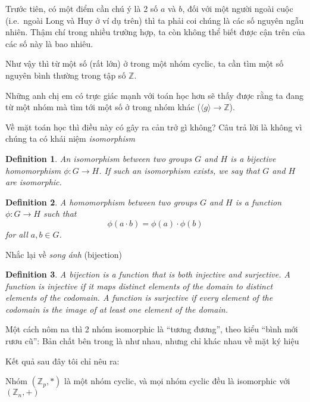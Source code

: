\documentclass[a4paper,12pt]{article}
\newtheorem{definition}{Definition}[section]
\newenvironment{fdefinition}
    {\begin{mdframed}\begin{definition}}
    {\end{definition}\end{mdframed}}
\begin{document}
Trước tiên, có một điểm cần chú ý là 2 số \(a\) và \(b\), đối với một người ngoài cuộc
(i.e.\ ngoài Long và Huy ở ví dụ trên) thì ta phải coi chúng là các số nguyên ngẫu nhiên.
Thậm chí trong nhiều trường hợp, ta còn không thể biết được cận trên của các số này là bao nhiêu.

Như vậy thì từ một số (rất lớn) ở trong một nhóm cyclic, ta cần tìm một số nguyên
bình thường trong tập số \(\mathbb{Z}\).

Những anh chị em có trực giác mạnh với toán học hơn sẽ thấy được rằng ta
đang từ một nhóm mà tìm tới một số ở trong nhóm khác (\(\langle g \rangle \to \mathbb{Z}\)).

Về mặt toán học thì điều này có gây ra cản trở gì không? Câu trả lời là không vì
chúng ta có khái niệm \emph{isomorphism}

\begin{fdefinition}
    An isomorphism between two groups \(G\) and \(H\) is a bijective homomorphism \(\phi: G \to H\).
    If such an isomorphism exists, we say that \(G\) and \(H\) are isomorphic.
\end{fdefinition}

\begin{fdefinition}
    A homomorphism between two groups \(G\) and \(H\) is a function \(\phi: G \to H\) such that
    \[
        \phi(a \cdot b) = \phi(a) \cdot \phi(b)
    \]
    for all \(a, b \in G\).
\end{fdefinition}

Nhắc lại về \emph{song ánh} (bijection)

\begin{fdefinition}
    A bijection is a function that is both injective and surjective.
    A function is injective if it maps distinct elements of the domain to distinct elements of the codomain.
    A function is surjective if every element of the codomain is the image of at least one element of the domain.
\end{fdefinition}

Một cách nôm na thì 2 nhóm isomorphic là ``tương đương'', theo kiểu ``bình mới rươu cũ'':
Bản chất bên trong là như nhau, nhưng chỉ khác nhau về mặt ký hiệu

Kết quả sau đây tôi chỉ nêu ra:

\begin{mdframed}
    Nhóm \((\mathbb{Z}_p, *)\) là một nhóm cyclic, và mọi nhóm cyclic đều là isomorphic với \((\mathbb{Z}_n, +)\)
\end{mdframed}
\end{document}
